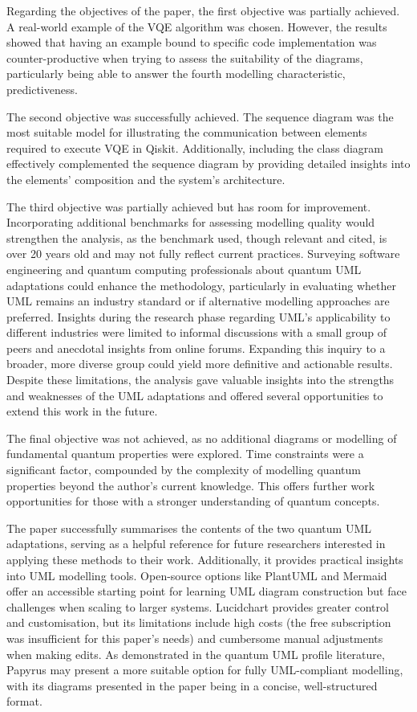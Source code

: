 \documentclass{article}
\begin{document}
Regarding the objectives of the paper, the first objective was partially achieved. A real-world example of the VQE algorithm was chosen. However, the results showed that having an example bound to specific code implementation was counter-productive when trying to assess the suitability of the diagrams, particularly being able to answer the fourth modelling characteristic, predictiveness.

The second objective was successfully achieved. The sequence diagram was the most suitable model for illustrating the communication between elements required to execute VQE in Qiskit. Additionally, including the class diagram effectively complemented the sequence diagram by providing detailed insights into the elements' composition and the system's architecture.

The third objective was partially achieved but has room for improvement. Incorporating additional benchmarks for assessing modelling quality would strengthen the analysis, as the benchmark used, though relevant and cited, is over 20 years old and may not fully reflect current practices. Surveying software engineering and quantum computing professionals about quantum UML adaptations could enhance the methodology, particularly in evaluating whether UML remains an industry standard or if alternative modelling approaches are preferred. Insights during the research phase regarding UML's applicability to different industries were limited to informal discussions with a small group of peers and anecdotal insights from online forums\cite{redditumloften}. Expanding this inquiry to a broader, more diverse group could yield more definitive and actionable results. Despite these limitations, the analysis gave valuable insights into the strengths and weaknesses of the UML adaptations and offered several opportunities to extend this work in the future. 

The final objective was not achieved, as no additional diagrams or modelling of fundamental quantum properties were explored. Time constraints were a significant factor, compounded by the complexity of modelling quantum properties beyond the author’s current knowledge. This offers further work opportunities for those with a stronger understanding of quantum concepts.

The paper successfully summarises the contents of the two quantum UML adaptations, serving as a helpful reference for future researchers interested in applying these methods to their work. Additionally, it provides practical insights into UML modelling tools. Open-source options like PlantUML and Mermaid offer an accessible starting point for learning UML diagram construction but face challenges when scaling to larger systems. Lucidchart provides greater control and customisation, but its limitations include high costs (the free subscription was insufficient for this paper’s needs) and cumbersome manual adjustments when making edits. As demonstrated in the quantum UML profile literature, Papyrus may present a more suitable option for fully UML-compliant modelling, with its diagrams presented in the paper being in a concise, well-structured format.
\end{document}
